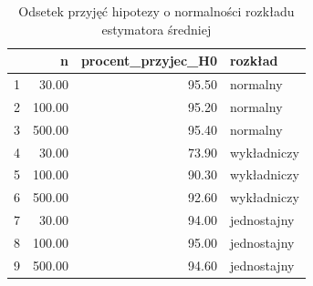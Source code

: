 \documentclass[10pt, a4paper]{article}\usepackage[]{graphicx}\usepackage[]{xcolor}
\begin{document}
\begin{table}[ht]
\centering
\caption{Odsetek przyjęć hipotezy o normalności rozkładu estymatora średniej} 
\label{tab:srednia_normalnosc}
\begin{tabular}{rrrl}
  \hline
 & n & procent\_przyjec\_H0 & rozkład \\ 
  \hline
1 & 30.00 & 95.50 & normalny \\ 
  2 & 100.00 & 95.20 & normalny \\ 
  3 & 500.00 & 95.40 & normalny \\ 
  4 & 30.00 & 73.90 & wykładniczy \\ 
  5 & 100.00 & 90.30 & wykładniczy \\ 
  6 & 500.00 & 92.60 & wykładniczy \\ 
  7 & 30.00 & 94.00 & jednostajny \\ 
  8 & 100.00 & 95.00 & jednostajny \\ 
  9 & 500.00 & 94.60 & jednostajny \\ 
   \hline
\end{tabular}
\end{table}
\end{document}

